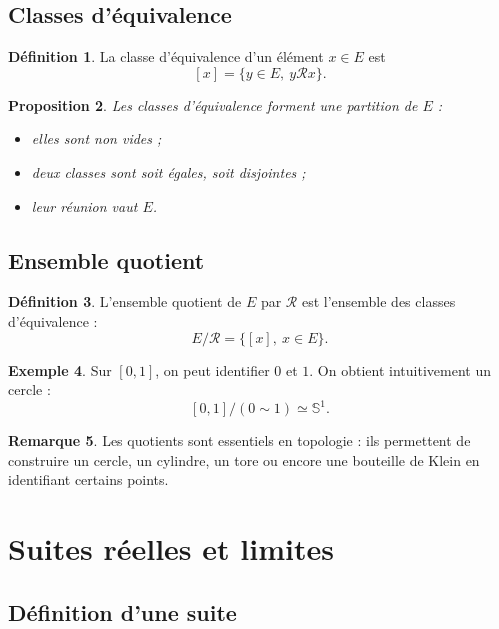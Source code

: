 \documentclass[11pt,a4paper]{article}
\theoremstyle{definition}
\newtheorem{definition}{Définition}[section]
\newtheorem{exemple}[definition]{Exemple}
\newtheorem{remarque}[definition]{Remarque}
\theoremstyle{plain}
\newtheorem{proposition}[definition]{Proposition}
\begin{document}
\subsection{Classes d'équivalence}

\begin{definition}
La classe d'équivalence d'un élément $x\in E$ est
\[
[x]=\{y\in E,\ y\mathcal R x\}.
\]
\end{definition}

\begin{proposition}
Les classes d'équivalence forment une partition de $E$ :
\begin{itemize}
    \item elles sont non vides ;
    \item deux classes sont soit égales, soit disjointes ;
    \item leur réunion vaut $E$.
\end{itemize}
\end{proposition}

\subsection{Ensemble quotient}

\begin{definition}
L'ensemble quotient de $E$ par $\mathcal R$ est l'ensemble des classes d'équivalence :
\[
E/\mathcal R=\{[x],\ x\in E\}.
\]
\end{definition}

\begin{exemple}
Sur $[0,1]$, on peut identifier $0$ et $1$.
On obtient intuitivement un cercle :
\[
[0,1]/(0\sim 1)\simeq \mathbb S^1.
\]
\end{exemple}

\begin{remarque}
Les quotients sont essentiels en topologie : ils permettent de construire un cercle, un cylindre, un tore ou encore une bouteille de Klein en identifiant certains points.
\end{remarque}

\section{Suites réelles et limites}

\subsection{Définition d'une suite}
\end{document}
